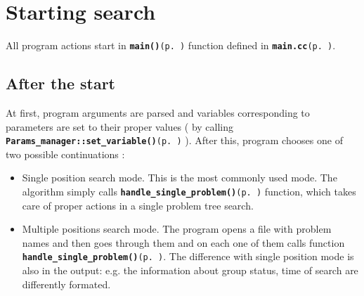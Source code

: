 \section{Starting search}\label{page_2}
All program actions start in {\tt {\bf main()}{\rm (p.\,\pageref{main_8cc_a6})}} function defined in {\tt {\bf main.cc}{\rm (p.\,\pageref{main_8cc})}}. \subsection{After the start}\label{page_2_page_2__sec_1}
At first, program arguments are parsed and variables corresponding to parameters are set to their proper values ( by calling {\tt {\bf Params\_\-manager::set\_\-variable()}{\rm (p.\,\pageref{classParams__manager_a23})}} ). After this, program chooses one of two possible continuations :\begin{itemize}
\item Single position search mode. This is the most commonly used mode. The algorithm simply calls {\tt {\bf handle\_\-single\_\-problem()}{\rm (p.\,\pageref{main_8cc_a3})}} function, which takes care of proper actions in a single problem tree search.\item Multiple positions search mode. The program opens a file with problem names and then goes through them and on each one of them calls function {\tt {\bf handle\_\-single\_\-problem()}{\rm (p.\,\pageref{main_8cc_a3})}}. The difference with single position mode is also in the output: e.g. the information about group status, time of search are differently formated.\end{itemize}
